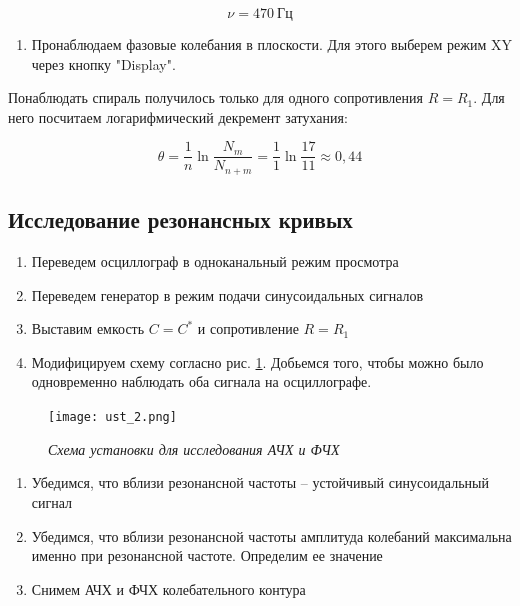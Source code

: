 \documentclass[a4paper,12pt]{article}
\begin{document}
\begin{equation*}
    \nu = 470 \ \text{Гц}
\end{equation*}

\begin{enumerate}[resume]
    \item Пронаблюдаем фазовые колебания в плоскости. Для этого выберем режим XY через кнопку "Display".
\end{enumerate}

Понаблюдать спираль получилось только для одного сопротивления $R = R_1$. Для него посчитаем логарифмический декремент затухания:

\begin{equation*}
    \theta = \frac{1}{n} \ln{\frac{N_m}{N_{n+m}}} = \frac{1}{1} \ln {\frac{17}{11}} \approx 0,44
\end{equation*}

\subsection{Исследование резонансных кривых}

\begin{enumerate}
    \item Переведем осциллограф в одноканальный режим просмотра
    \item Переведем генератор в режим подачи синусоидальных сигналов
    \item Выставим емкость $C = C^*$ и сопротивление $R = R_1$
    \item Модифицируем схему согласно рис. \ref{pic:2}. Добьемся того, чтобы можно было одновременно наблюдать оба сигнала на осциллографе.
\end{enumerate}

\begin{figure}[h!]
    \texttt{[image: ust\_2.png]}
    \caption{\textit{Схема установки для исследования АЧХ и ФЧХ}}
    \label{pic:2}
\end{figure}

\FloatBarrier

\begin{enumerate}[resume]
    \item Убедимся, что вблизи резонансной частоты -- устойчивый синусоидальный сигнал
    \item Убедимся, что вблизи резонансной частоты амплитуда колебаний максимальна именно при резонансной частоте. Определим ее значение
    \item Снимем АЧХ и ФЧХ колебательного контура
\end{enumerate}
\end{document}
